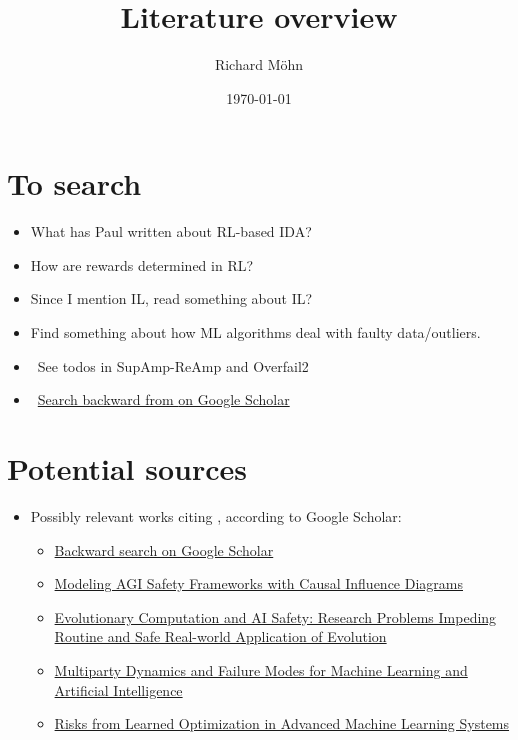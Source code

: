 \documentclass{farlamp}
\author{Richard Möhn}
\date{\today}
\title{Literature overview}
\begin{document}
\maketitle
\tableofcontents

\section{To search}

\begin{itemize}
    \item What has Paul written about RL-based IDA?
    \item How are rewards determined in RL?
    \item Since I mention IL, read something about IL?
    \item Find something about how ML algorithms deal with faulty data/outliers.
    \item \done\ See todos in SupAmp-ReAmp and Overfail2
    \item \done\ \href{https://scholar.google.com/scholar?hl=en&as_sdt=0%2C5&q=supervising+strong+learners+by+amplifying+weak+experts&btnG=}{Search
        backward from \textcite{CSASupAmp} on Google Scholar}
\end{itemize}


\section{Potential sources}

\begin{itemize}
    \item Possibly relevant works citing \textcite{CSASupAmp}, according to
        Google Scholar:
        \begin{itemize}
            \item \href{https://scholar.google.com/scholar?hl=en&as_sdt=0%2C5&q=supervising+strong+learners+by+amplifying+weak+experts&btnG=}{Backward search on Google Scholar}
            \item \href{https://arxiv.org/abs/1906.08663}{Modeling AGI Safety Frameworks
                with Causal Influence Diagrams}
            \item \href{https://arxiv.org/abs/1906.10189}{Evolutionary
                Computation and AI Safety: Research Problems Impeding Routine
                and Safe Real-world Application of Evolution}
            \item \href{https://www.mdpi.com/2504-2289/3/2/21}{Multiparty
                Dynamics and Failure Modes for Machine Learning and Artificial
                Intelligence}
            \item \href{https://arxiv.org/abs/1906.01820}{Risks from Learned Optimization in Advanced Machine Learning Systems}
        \end{itemize}
\end{itemize}
\end{document}
